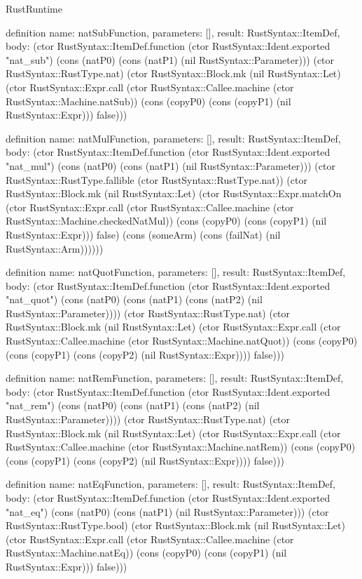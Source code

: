 \begin{lexlean}{RustRuntime}
\begin{semanticmodule}
definition{
  name: natSubFunction,
  parameters: [],
  result: RustSyntax::ItemDef,
  body: (ctor RustSyntax::ItemDef.function (ctor RustSyntax::Ident.exported "nat_sub") (cons (natP0) (cons (natP1) (nil RustSyntax::Parameter))) (ctor RustSyntax::RustType.nat) (ctor RustSyntax::Block.mk (nil RustSyntax::Let) (ctor RustSyntax::Expr.call (ctor RustSyntax::Callee.machine (ctor RustSyntax::Machine.natSub)) (cons (copyP0) (cons (copyP1) (nil RustSyntax::Expr))) false)))
}

definition{
  name: natMulFunction,
  parameters: [],
  result: RustSyntax::ItemDef,
  body: (ctor RustSyntax::ItemDef.function (ctor RustSyntax::Ident.exported "nat_mul") (cons (natP0) (cons (natP1) (nil RustSyntax::Parameter))) (ctor RustSyntax::RustType.fallible (ctor RustSyntax::RustType.nat)) (ctor RustSyntax::Block.mk (nil RustSyntax::Let) (ctor RustSyntax::Expr.matchOn (ctor RustSyntax::Expr.call (ctor RustSyntax::Callee.machine (ctor RustSyntax::Machine.checkedNatMul)) (cons (copyP0) (cons (copyP1) (nil RustSyntax::Expr))) false) (cons (someArm) (cons (failNat) (nil RustSyntax::Arm))))))
}

definition{
  name: natQuotFunction,
  parameters: [],
  result: RustSyntax::ItemDef,
  body: (ctor RustSyntax::ItemDef.function (ctor RustSyntax::Ident.exported "nat_quot") (cons (natP0) (cons (natP1) (cons (natP2) (nil RustSyntax::Parameter)))) (ctor RustSyntax::RustType.nat) (ctor RustSyntax::Block.mk (nil RustSyntax::Let) (ctor RustSyntax::Expr.call (ctor RustSyntax::Callee.machine (ctor RustSyntax::Machine.natQuot)) (cons (copyP0) (cons (copyP1) (cons (copyP2) (nil RustSyntax::Expr)))) false)))
}

definition{
  name: natRemFunction,
  parameters: [],
  result: RustSyntax::ItemDef,
  body: (ctor RustSyntax::ItemDef.function (ctor RustSyntax::Ident.exported "nat_rem") (cons (natP0) (cons (natP1) (cons (natP2) (nil RustSyntax::Parameter)))) (ctor RustSyntax::RustType.nat) (ctor RustSyntax::Block.mk (nil RustSyntax::Let) (ctor RustSyntax::Expr.call (ctor RustSyntax::Callee.machine (ctor RustSyntax::Machine.natRem)) (cons (copyP0) (cons (copyP1) (cons (copyP2) (nil RustSyntax::Expr)))) false)))
}

definition{
  name: natEqFunction,
  parameters: [],
  result: RustSyntax::ItemDef,
  body: (ctor RustSyntax::ItemDef.function (ctor RustSyntax::Ident.exported "nat_eq") (cons (natP0) (cons (natP1) (nil RustSyntax::Parameter))) (ctor RustSyntax::RustType.bool) (ctor RustSyntax::Block.mk (nil RustSyntax::Let) (ctor RustSyntax::Expr.call (ctor RustSyntax::Callee.machine (ctor RustSyntax::Machine.natEq)) (cons (copyP0) (cons (copyP1) (nil RustSyntax::Expr))) false)))
}


\end{semanticmodule}
\end{lexlean}
